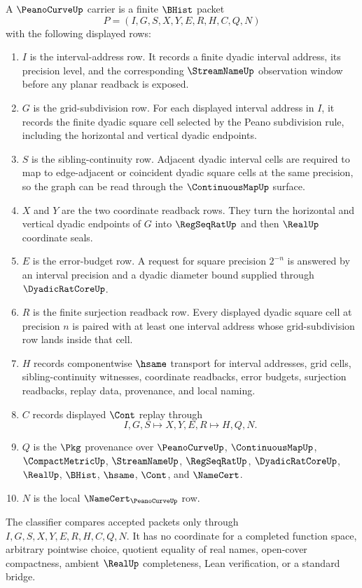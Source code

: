 \begin{definition}
\label{def:peano-curve-carrier}
A $\PeanoCurveUp$ carrier is a finite $\BHist$ packet
$$
P=(I,G,S,X,Y,E,R,H,C,Q,N)
$$
with the following displayed rows:
\begin{enumerate}
\item $I$ is the interval-address row. It records a finite dyadic interval address, its precision level, and the corresponding $\StreamNameUp$ observation window before any planar readback is exposed.
\item $G$ is the grid-subdivision row. For each displayed interval address in $I$, it records the finite dyadic square cell selected by the Peano subdivision rule, including the horizontal and vertical dyadic endpoints.
\item $S$ is the sibling-continuity row. Adjacent dyadic interval cells are required to map to edge-adjacent or coincident dyadic square cells at the same precision, so the graph can be read through the $\ContinuousMapUp$ surface.
\item $X$ and $Y$ are the two coordinate readback rows. They turn the horizontal and vertical dyadic endpoints of $G$ into $\RegSeqRatUp$ and then $\RealUp$ coordinate seals.
\item $E$ is the error-budget row. A request for square precision $2^{-n}$ is answered by an interval precision and a dyadic diameter bound supplied through $\DyadicRatCoreUp$.
\item $R$ is the finite surjection readback row. Every displayed dyadic square cell at precision $n$ is paired with at least one interval address whose grid-subdivision row lands inside that cell.
\item $H$ records componentwise $\hsame$ transport for interval addresses, grid cells, sibling-continuity witnesses, coordinate readbacks, error budgets, surjection readbacks, replay data, provenance, and local naming.
\item $C$ records displayed $\Cont$ replay through
$$
I,G,S \longmapsto X,Y,E,R \longmapsto H,Q,N .
$$
\item $Q$ is the $\Pkg$ provenance over $\PeanoCurveUp$, $\ContinuousMapUp$, $\CompactMetricUp$, $\StreamNameUp$, $\RegSeqRatUp$, $\DyadicRatCoreUp$, $\RealUp$, $\BHist$, $\hsame$, $\Cont$, and $\NameCert$.
\item $N$ is the local $\NameCert_{\PeanoCurveUp}$ row.
\end{enumerate}
The classifier compares accepted packets only through $I,G,S,X,Y,E,R,H,C,Q,N$. It has no coordinate for a completed function space, arbitrary pointwise choice, quotient equality of real names, open-cover compactness, ambient $\RealUp$ completeness, Lean verification, or a standard bridge.
\end{definition}

